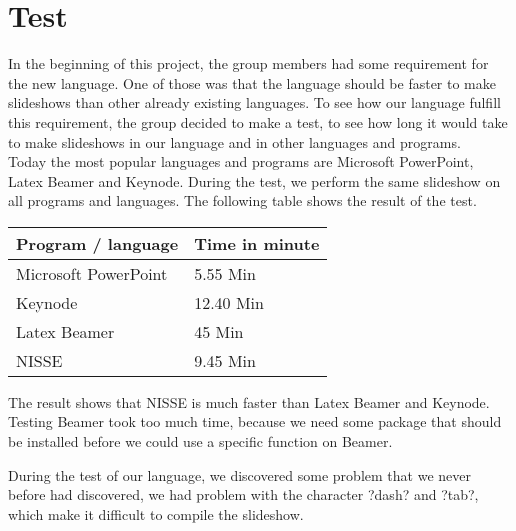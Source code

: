 \chapter{Test}
In the beginning of this project, the group members had some requirement for the new language.  One of those was that the language should be faster to make slideshows than other already existing languages. To see how our language fulfill this requirement, the group decided to make a test, to see how long it would take to make slideshows in our language and in other languages and programs.\\

Today the most popular languages and programs are Microsoft PowerPoint, Latex Beamer and Keynode. During the test, we perform the same slideshow on all programs and languages. The following table shows the result of the test.

\begin{center}
    \begin{tabular}{ | l | l |}
    \hline
    Program / language & Time in minute \\ \hline
    Microsoft PowerPoint & 5.55 	Min \\ \hline
    Keynode & 12.40 				Min \\ \hline
    Latex Beamer & 45 				Min \\ \hline
    NISSE & 9.45 					Min \\ \hline
    \end{tabular}
\end{center}

The result shows that NISSE is much faster than Latex Beamer and Keynode.  Testing Beamer took too much time, because we need some package that should be installed before we could use a specific function on Beamer.

During the test of our language, we discovered some problem that we never before had discovered, we had problem with the character ?dash? and ?tab?, which make it difficult to compile the slideshow.